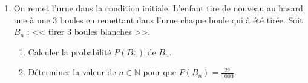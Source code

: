\begin{description}
\begin{enumerate}
\begin{enumerate}
                              \end{enumerate}
                        \item On remet l'urne dans la condition initiale.
                              L'enfant tire de nouveau au hasard une \`a une 3 boules 
                              en remettant dans l'urne chaque boule qui \`a \'et\'e tir\'ee.
                              Soit $B_n$ : << tirer 3 boules blanches >>.
                              \begin{enumerate}
                                    \item Calculer la probabilit\'e $P(B_n)$ de $B_n$.
                                    \item D\'eterminer la valeur de $n\in\mathbb{N}$ pour que $P(B_n) = \frac{27}{1000}$.
                              \end{enumerate}
                  \end{enumerate}
      \end{description}

